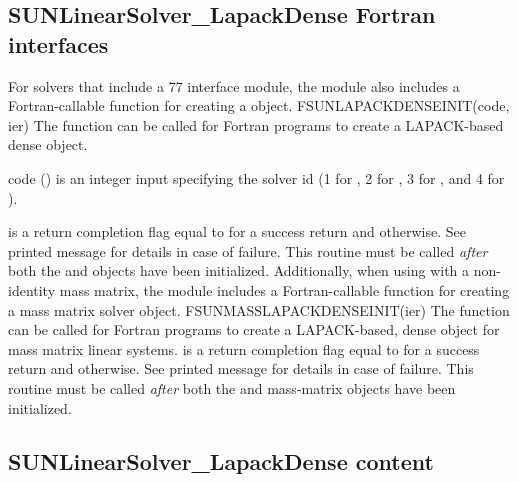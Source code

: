 \subsection{SUNLinearSolver\_LapackDense Fortran interfaces}
\label{ss:sunlinsol_lapdense_fortran}

For solvers that include a {\F} 77 interface module, the {\sunlinsollapdense}
module also includes a Fortran-callable function for creating a
 object.
%
%
{
  FSUNLAPACKDENSEINIT(code, ier)
}
{
  The function  can be called for Fortran programs
  to create a LAPACK-based dense  object.
}
{
  \begin{args}[code]
  \item[code] ()
    is an integer input specifying the solver id (1 for {\cvode}, 2
    for {\ida}, 3 for {\kinsol}, and 4 for {\arkode}).
  \end{args}
}
{
   is a return completion flag equal to  for a success
  return and  otherwise. See printed message for details in case
  of failure.
}
{
  This routine must be
  called \emph{after} both the {\nvector} and {\sunmatrix} objects have
  been initialized.
}
Additionally, when using {\arkode} with a non-identity
mass matrix, the {\sunlinsollapdense} module includes a Fortran-callable
function for creating a  mass matrix solver
object.
%
%
{
  FSUNMASSLAPACKDENSEINIT(ier)
}
{
  The function  can be called for Fortran programs
  to create a LAPACK-based, dense  object for mass matrix linear
  systems.
}
{}
{
   is a  return completion flag equal to  for a success
  return and  otherwise. See printed message for details in case
  of failure.
}
{
  This routine must be
  called \emph{after} both the {\nvector} and {\sunmatrix} mass-matrix
  objects have been initialized.
}


\subsection{SUNLinearSolver\_LapackDense content}
\label{ss:sunlinsol_lapdense_content}

